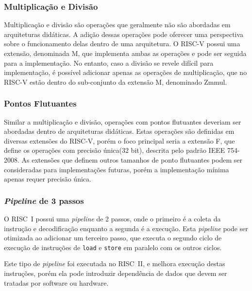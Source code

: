 \documentclass[
	12pt,				%
	openright,			%
	oneside,			%
	a4paper,			%
	english,			%
	french,				%
	spanish,			%
	brazil,				%
	]{abntex2}
\begin{document}
\subsubsection{Multiplicação e Divisão}\label{recursos_muldiv}%

Multiplicação e divisão são operações que geralmente não são abordadas em arquiteturas didáticas. A adição dessas operações pode oferecer uma perspectiva sobre o funcionamento delas dentro de uma arquitetura. O RISC-V possui uma extensão, denominada M, que implementa ambas as operações e pode ser seguida para a implementação. No entanto, caso a divisão se revele difícil para implementação, é possível adicionar apenas as operações de multiplicação, que no RISC-V estão dentro do sub-conjunto da extensão M, denominado Zmmul.

\subsubsection{Pontos Flutuantes}\label{recursos_float}%

Similar a multiplicação e divisão, operações com pontos flutuantes deveriam ser abordadas dentro de arquiteturas didáticas. Estas operações são definidas em diversas extensões do RISC-V, porém o foco principal seria a extensão F, que define os operações com precisão única(32 bit), descrita pelo padrão IEEE 754-2008\cite{risc-v_risc-v_2024}. As extensões que definem outros tamanhos de ponto flutuantes podem ser consideradas para implementações futuras, porém a implementação mínima apenas requer precisão única.

\subsubsection{\textit{Pipeline} de 3 passos}\label{recursos_pipe3}%

O RISC~I possui uma \textit{pipeline} de 2 passos, onde o primeiro é a coleta da instrução e decodificação enquanto a segunda é a execução. Esta \textit{pipeline} pode ser otimizada ao adicionar um terceiro passo, que executa o segundo ciclo de execução de instruções de \texttt{load} e \texttt{store} em paralelo com os outros ciclos.

Este tipo de \textit{pipeline} foi executada no RISC~II, e melhora execução destas instruções, porém ela pode introduzir dependência de dados que devem ser tratadas por software ou hardware.
\end{document}
